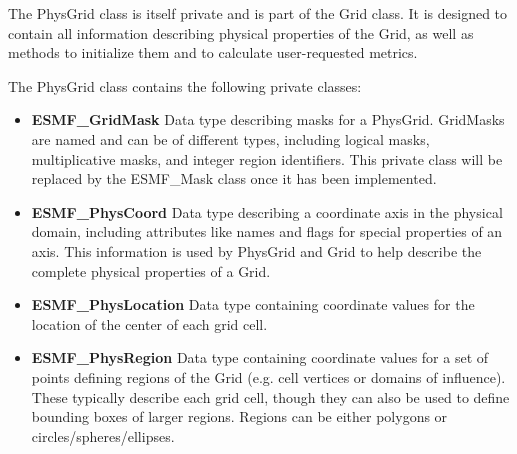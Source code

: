 %

\label{sec:PhysGridClasses}


The PhysGrid class is itself private and is part of the Grid
class.  It is designed to contain all information describing physical
properties of the Grid, as well as methods to initialize them and to
calculate user-requested metrics.

The PhysGrid class contains the following private classes:
\begin{itemize}

\item {\bf ESMF\_GridMask} Data type describing masks for a PhysGrid. 
GridMasks are named and can be of different types, including logical masks,
multiplicative masks, and integer region identifiers.  This private class
will be replaced by the ESMF\_Mask class once it has been implemented.

\item {\bf ESMF\_PhysCoord} Data type describing a coordinate axis in the
physical domain, including attributes like names and flags for special
properties of an axis.  This information is used by PhysGrid and Grid
to help describe the complete physical properties of a Grid.

\item {\bf ESMF\_PhysLocation} Data type containing coordinate values for 
the location of the center of each grid cell.

\item {\bf ESMF\_PhysRegion} Data type containing coordinate values for a set
of points defining regions of the Grid (e.g. cell vertices or domains of
influence).  These typically describe each grid cell, though they can also be
used to define bounding boxes of larger regions.  Regions can be either
polygons or circles/spheres/ellipses.

\end{itemize}






